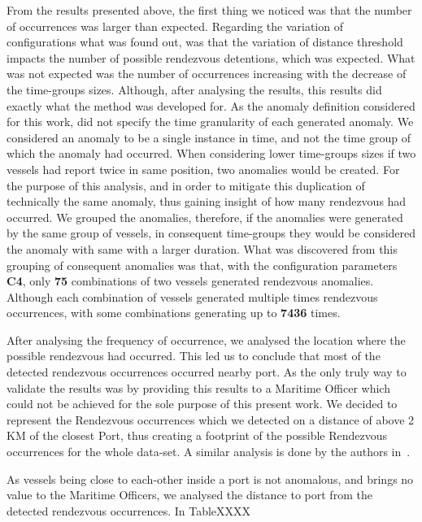 From the results presented above, the first thing we noticed was that the number of occurrences was larger than expected. Regarding the variation of configurations what was found out, was that the variation of distance threshold impacts the number of possible rendezvous detentions, which was expected.
What was not expected was the number of occurrences increasing with the decrease of the time-groups sizes. 
Although, after analysing the results, this results did exactly what the method was developed for.  As the anomaly definition considered for this work, did not specify the time granularity of each generated anomaly. We considered an anomaly to be a single instance in time, and not the time group of which the anomaly had occurred. When considering lower time-groups sizes if two vessels had report twice in same position, two anomalies would be created. For the purpose of this analysis, and in order to mitigate this duplication of technically the same anomaly, thus gaining insight of how many rendezvous had occurred. We grouped the anomalies, therefore, if the anomalies were generated by the same group of vessels, in consequent time-groups they would be considered the anomaly with same with a larger duration. 
What was discovered from this grouping of consequent anomalies was that, with the configuration parameters \textbf{C4}, only \textbf{75} combinations of two vessels generated rendezvous anomalies. Although each combination of vessels generated multiple times rendezvous occurrences, with some combinations generating up to \textbf{7436} times.

After analysing the frequency of occurrence, we analysed the location where the possible rendezvous had occurred. This led us to conclude that most of the detected rendezvous occurrences occurred nearby port.
As the only truly way to validate the results was by providing this results to a Maritime Officer which could not be achieved for the sole purpose of this present work. We decided to represent the Rendezvous occurrences which we detected on a distance of above 2 KM of the closest Port, thus creating a footprint of the possible Rendezvous occurrences for the whole data-set. A similar analysis is done by the authors in~\cite{Miller2018IdentifyingBehavior}. 

As vessels being close to each-other inside a port is not anomalous, and brings no value to the Maritime Officers, we analysed the distance to port from the detected rendezvous occurrences. 
In TableXXXX%

